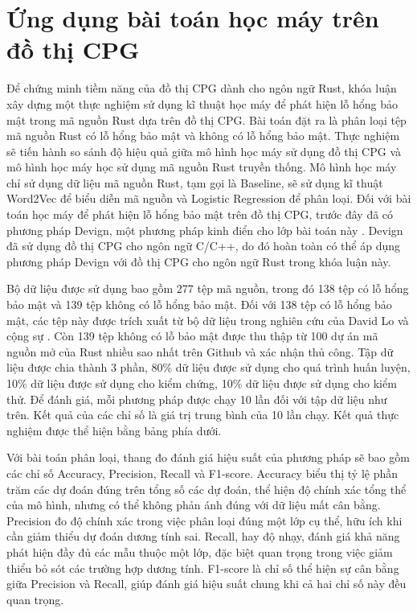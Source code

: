\section{Ứng dụng bài toán học máy trên đồ thị CPG}


Để chứng minh tiềm năng của đồ thị CPG dành cho ngôn ngữ Rust, khóa luận xây dựng một thực nghiệm sử dụng kĩ thuật học máy để phát hiện lỗ hổng bảo mật trong mã nguồn Rust dựa trên đồ thị CPG.
Bài toán đặt ra là phân loại tệp mã nguồn Rust có lỗ hổng bảo mật và không có lỗ hổng bảo mật.
Thực nghiệm sẽ tiến hành so sánh độ hiệu quả giữa mô hình học máy sử dụng đồ thị CPG và mô hình học máy học sử dụng mã nguồn Rust truyền thống.
Mô hình học máy chỉ sử dụng dữ liệu mã nguồn Rust, tạm gọi là Baseline, sẽ sử dụng kĩ thuật Word2Vec \cite{church2017word2vec} để biểu diễn mã nguồn và Logistic Regression \cite{lavalley2008logistic} để phân loại.
Đối với bài toán học máy để phát hiện lỗ hổng bảo mật trên đồ thị CPG, trước đây đã có phương pháp Devign, một phương pháp kinh điển cho lớp bài toán này \cite{zhou2019devign}.
Devign đã sử dụng đồ thị CPG cho ngôn ngữ C/C++, do đó hoàn toàn có thể áp dụng phương pháp Devign với đồ thị CPG cho ngôn ngữ Rust trong khóa luận này.

Bộ dữ liệu được sử dụng bao gồm 277 tệp mã nguồn, trong đó 138 tệp có lỗ hổng bảo mật và 139 tệp không có lỗ hổng bảo mật.
Đối với 138 tệp có lỗ hổng bảo mật, các tệp này được trích xuất từ bộ dữ liệu trong nghiên cứu của David Lo và cộng sự \cite{zheng2023closer}.
Còn 139 tệp không có lỗ bảo mật được thu thập từ 100 dự án mã nguồn mở của Rust nhiều sao nhất trên Github \cite{githubGithubRankingTop100RustmdMaster} và xác nhận thủ công.
Tập dữ liệu được chia thành 3 phần, 80\% dữ liệu được sử dụng cho quá trình huấn luyện, 10\% dữ liệu được sử dụng cho kiểm chứng, 10\% dữ liệu được sử dụng cho kiểm thử.
Để đánh giá, mỗi phương pháp được chạy 10 lần đối với tập dữ liệu như trên.
Kết quả của các chỉ số là giá trị trung bình của 10 lần chạy.
Kết quả thực nghiệm được thể hiện bằng bảng phía dưới.

Với bài toán phân loại, thang đo đánh giá hiệu suất của phương pháp sẽ bao gồm các chỉ số Accuracy, Precision, Recall và F1-score.
Accuracy biểu thị tỷ lệ phần trăm các dự đoán đúng trên tổng số các dự đoán, thể hiện độ chính xác tổng thể của mô hình, nhưng có thể không phản ánh đúng với dữ liệu mất cân bằng.
Precision đo độ chính xác trong việc phân loại đúng một lớp cụ thể, hữu ích khi cần giảm thiểu dự đoán dương tính sai.
Recall, hay độ nhạy, đánh giá khả năng phát hiện đầy đủ các mẫu thuộc một lớp, đặc biệt quan trọng trong việc giảm thiểu bỏ sót các trường hợp dương tính.
F1-score là chỉ số thể hiện sự cân bằng giữa Precision và Recall, giúp đánh giá hiệu suất chung khi cả hai chỉ số này đều quan trọng.


